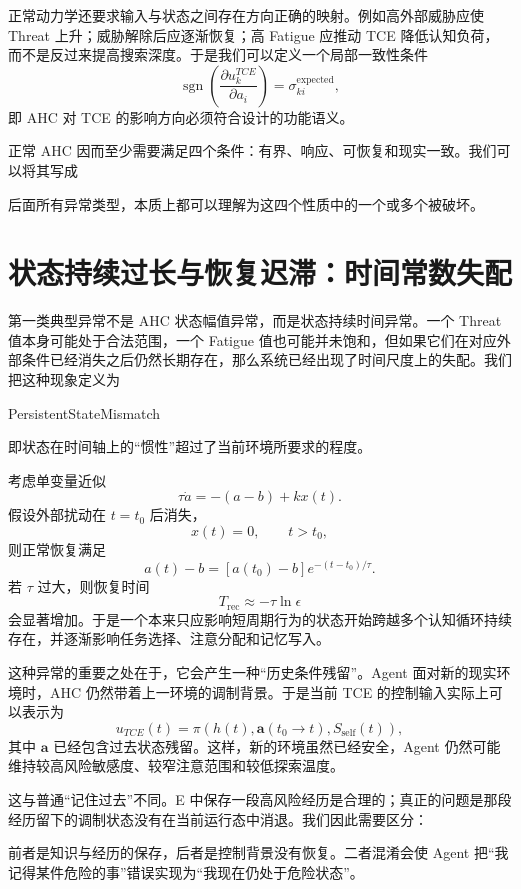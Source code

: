 正常动力学还要求输入与状态之间存在方向正确的映射。例如高外部威胁应使 Threat 上升；威胁解除后应逐渐恢复；高 Fatigue 应推动 TCE 降低认知负荷，而不是反过来提高搜索深度。于是我们可以定义一个局部一致性条件
\[
\operatorname{sgn}
\left(
\frac{\partial u_k^{TCE}}{\partial a_i}
\right)
=
\sigma_{ki}^{\mathrm{expected}},
\]
即 AHC 对 TCE 的影响方向必须符合设计的功能语义。

正常 AHC 因而至少需要满足四个条件：有界、响应、可恢复和现实一致。我们可以将其写成
\begin{statementbox}
\centering
{}
\end{statementbox}
后面所有异常类型，本质上都可以理解为这四个性质中的一个或多个被破坏。

\section{状态持续过长与恢复迟滞：时间常数失配}
\label{sec:ahc_persistence}

第一类典型异常不是 AHC 状态幅值异常，而是状态持续时间异常。一个 Threat 值本身可能处于合法范围，一个 Fatigue 值也可能并未饱和，但如果它们在对应外部条件已经消失之后仍然长期存在，那么系统已经出现了时间尺度上的失配。我们把这种现象定义为
\begin{statementbox}
PersistentStateMismatch
\end{statementbox}
即状态在时间轴上的“惯性”超过了当前环境所要求的程度。

考虑单变量近似
\[
\tau\dot a
=
-(a-b)+kx(t).
\]
假设外部扰动在 $t=t_0$ 后消失，
\[
x(t)=0,\qquad t>t_0,
\]
则正常恢复满足
\[
a(t)-b
=
\left[
a(t_0)-b
\right]
e^{-(t-t_0)/\tau}.
\]
若 $\tau$ 过大，则恢复时间
\[
T_{\mathrm{rec}}
\approx
-\tau
\ln\epsilon
\]
会显著增加。于是一个本来只应影响短周期行为的状态开始跨越多个认知循环持续存在，并逐渐影响任务选择、注意分配和记忆写入。

这种异常的重要之处在于，它会产生一种“历史条件残留”。Agent 面对新的现实环境时，AHC 仍然带着上一环境的调制背景。于是当前 TCE 的控制输入实际上可以表示为
\[
u_{TCE}(t)
=
\pi
\left(
h(t),
\mathbf a(t_0\!\rightarrow\!t),
S_{\mathrm{self}}(t)
\right),
\]
其中 $\mathbf a$ 已经包含过去状态残留。这样，新的环境虽然已经安全，Agent 仍然可能维持较高风险敏感度、较窄注意范围和较低探索温度。

这与普通“记住过去”不同。E 中保存一段高风险经历是合理的；真正的问题是那段经历留下的调制状态没有在当前运行态中消退。我们因此需要区分：
\begin{statementbox}
\centering
{}
\end{statementbox}
前者是知识与经历的保存，后者是控制背景没有恢复。二者混淆会使 Agent 把“我记得某件危险的事”错误实现为“我现在仍处于危险状态”。

